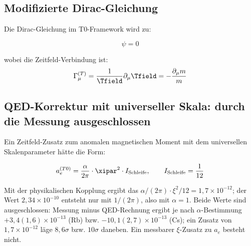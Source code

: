 	\subsection{Modifizierte Dirac-Gleichung}
	\label{subsec:modifizierte_dirac}
	
	Die Dirac-Gleichung im T0-Framework wird zu:
	
	\begin{equation}
		[i\gamma^{\mu}(\partial_{\mu} + \Gamma_{\mu}^{(T)}) - m(x,t)]\psi = 0
		\label{eq:t0_dirac}
	\end{equation}
	
	wobei die Zeitfeld-Verbindung ist:
	\begin{equation}
		\Gamma_{\mu}^{(T)} = \frac{1}{\Tfield} \partial_{\mu} \Tfield = -\frac{\partial_{\mu} m}{m}
		\label{eq:zeitfeld_verbindung}
	\end{equation}
	
	\subsection{QED-Korrektur mit universeller Skala: durch die Messung ausgeschlossen}
	\label{subsec:qed_korrekturen_universell}
	
	Ein Zeitfeld-Zusatz zum anomalen magnetischen Moment mit dem universellen Skalenparameter hätte die Form:
	
	\begin{equation}
		a_e^{(T0)} = \frac{\alpha}{2\pi} \cdot \xipar^2 \cdot I_{\text{Schleife}}, \qquad I_{\text{Schleife}} = \frac{1}{12}
		\label{eq:anomales_moment_korrektur}
	\end{equation}
	
	Mit der physikalischen Kopplung ergibt das $\alpha/(2\pi)\cdot\xi^2/12 = 1{,}7\times10^{-12}$; der Wert $2{,}34\times10^{-10}$ entsteht nur mit $1/(2\pi)$, also mit $\alpha=1$. Beide Werte sind ausgeschlossen: Messung minus QED-Rechnung ergibt je nach $\alpha$-Bestimmung $+3{,}4(1{,}6)\times10^{-13}$ (Rb) bzw. $-10{,}1(2{,}7)\times10^{-13}$ (Cs); ein Zusatz von $1{,}7\times10^{-12}$ läge $8{,}6\sigma$ bzw. $10\sigma$ daneben. Ein messbarer $\xi$-Zusatz zu $a_e$ besteht nicht.
	
